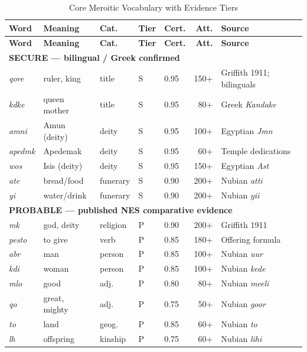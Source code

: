 \documentclass[11pt,a4paper]{article}
\begin{document}
\begin{longtable}{lllllrl}
  \caption{Core Meroitic Vocabulary with Evidence Tiers} \label{tab:vocab} \\
  \toprule
  \textbf{Word} & \textbf{Meaning} & \textbf{Cat.} & \textbf{Tier} & \textbf{Cert.} & \textbf{Att.} & \textbf{Source} \\
  \midrule
  \endfirsthead
  \toprule
  \textbf{Word} & \textbf{Meaning} & \textbf{Cat.} & \textbf{Tier} & \textbf{Cert.} & \textbf{Att.} & \textbf{Source} \\
  \midrule
  \endhead
  \multicolumn{7}{l}{\textbf{SECURE --- bilingual / Greek confirmed}} \\
  \midrule
    \textit{qore} & ruler, king & title & S & 0.95 & 150+ & Griffith 1911; bilinguals \\
    \textit{kdke} & queen mother & title & S & 0.95 & 80+ & Greek \textit{Kandake} \\
    \textit{amni} & Amun (deity) & deity & S & 0.95 & 100+ & Egyptian \textit{Jmn} \\
    \textit{apedmk} & Apedemak & deity & S & 0.95 & 60+ & Temple dedications \\
    \textit{wos} & Isis (deity) & deity & S & 0.95 & 150+ & Egyptian \textit{Ast} \\
    \textit{ate} & bread/food & funerary & S & 0.90 & 200+ & Nubian \textit{atti} \\
    \textit{yi} & water/drink & funerary & S & 0.90 & 200+ & Nubian \textit{yii} \\
  \midrule
  \multicolumn{7}{l}{\textbf{PROBABLE --- published NES comparative evidence}} \\
  \midrule
    \textit{mk} & god, deity & religion & P & 0.90 & 200+ & Griffith 1911 \\
    \textit{pesto} & to give & verb & P & 0.85 & 180+ & Offering formula \\
    \textit{abr} & man & person & P & 0.85 & 100+ & Nubian \textit{uur} \\
    \textit{kdi} & woman & person & P & 0.85 & 100+ & Nubian \textit{kede} \\
    \textit{mlo} & good & adj. & P & 0.80 & 80+ & Nubian \textit{meeli} \\
    \textit{qo} & great, mighty & adj. & P & 0.75 & 50+ & Nubian \textit{goor} \\
    \textit{to} & land & geog. & P & 0.85 & 60+ & Nubian \textit{to} \\
    \textit{lh} & offspring & kinship & P & 0.75 & 60+ & Nubian \textit{lihi} \\

\end{longtable}
\end{document}
